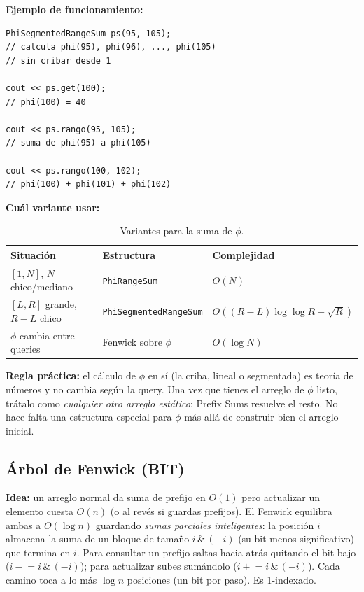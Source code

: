 \documentclass[10pt,a4paper,twocolumn]{article}
\begin{document}
\textbf{Ejemplo de funcionamiento:}

\begin{lstlisting}[style=cpp]
PhiSegmentedRangeSum ps(95, 105);
// calcula phi(95), phi(96), ..., phi(105)
// sin cribar desde 1

cout << ps.get(100);
// phi(100) = 40

cout << ps.rango(95, 105);
// suma de phi(95) a phi(105)

cout << ps.rango(100, 102);
// phi(100) + phi(101) + phi(102)
\end{lstlisting}

\textbf{Cuál variante usar:}

\begin{table}[H]
\centering
\tiny
\setlength{\tabcolsep}{1.5pt}
\renewcommand{\arraystretch}{1.1}
\begin{tabular}{|p{}|p{}|p{}|}
\hline
\textbf{Situación} & \textbf{Estructura} & \textbf{Complejidad} \\
\hline
$[1,N]$, $N$ chico/mediano
& \texttt{PhiRangeSum}
& $O(N)$ \\
\hline
$[L,R]$ grande, $R-L$ chico
& \texttt{PhiSegmentedRangeSum}
& $O((R{-}L)\log\log R+\sqrt{R})$ \\
\hline
$\phi$ cambia entre queries
& Fenwick sobre $\phi$
& $O(\log N)$ \\
\hline
\end{tabular}
\caption{Variantes para la suma de $\phi$.}
\label{tab:phi_variants}
\end{table}

\textbf{Regla práctica:} el cálculo de $\phi$ en sí (la criba, lineal
o segmentada) es teoría de números y no cambia según la query. Una vez
que tienes el arreglo de $\phi$ listo, trátalo como \emph{cualquier
otro arreglo estático}: Prefix Sums resuelve el resto. No hace falta
una estructura especial para $\phi$ más allá de construir bien el
arreglo inicial.



\subsection{Árbol de Fenwick (BIT)}

\textbf{Idea:} un arreglo normal da suma de prefijo en $O(1)$ pero
actualizar un elemento cuesta $O(n)$ (o al revés si guardas prefijos).
El Fenwick equilibra ambas a $O(\log n)$ guardando \emph{sumas
parciales inteligentes}: la posición $i$ almacena la suma de un bloque
de tamaño $i\,\&\,(-i)$ (su bit menos significativo) que termina en
$i$. Para consultar un prefijo saltas hacia atrás quitando el bit bajo
($i\mathrel{-}=i\,\&\,(-i)$); para actualizar subes sumándolo
($i\mathrel{+}=i\,\&\,(-i)$). Cada camino toca a lo más $\log n$
posiciones (un bit por paso). Es 1-indexado.
\end{document}
